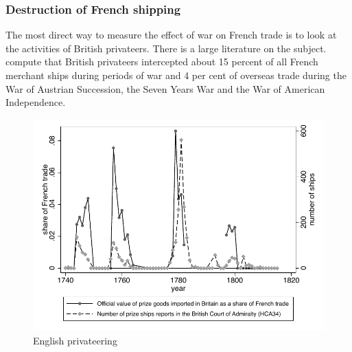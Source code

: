 \documentclass[12pt,a4paper,notitlepage,english]{article}
\begin{document}
\subsubsection{Destruction of French shipping}
The most direct way to measure the effect of war on French trade is to look at the activities of British privateers. 
There is a large literature on the subject. \cite{Hillmann2011} compute that British privateers intercepted about 15 percent of all French merchant ships during periods of war and 4 per cent of overseas trade during the War of Austrian Succession, the Seven Years War and the War of American Independence. 


\begin{center}
	\begin{figure}[H]
		\caption{English privateering}
		\label{GBannual_loss_function}
		\centering
		\includegraphics[scale=0.9]{Prizes.pdf}
	\end{figure}
\end{center}
\end{document}
